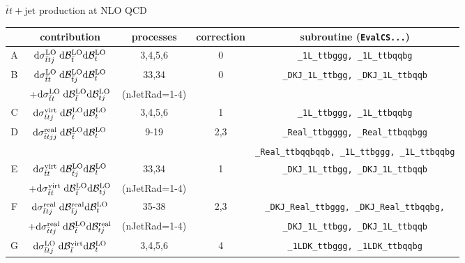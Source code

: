 \documentclass[12pt]{article}
\begin{document}
\centerline{\Large $\bar{t} t + \mathrm{jet}$ production at NLO QCD}


\vspace{1cm}
\newcommand{\tb}{\bar{t}}
\newcommand{\rd}{\mathrm{d}}
\newcommand{\LO}{\mathrm{LO}}
\newcommand{\NLO}{\mathrm{NLO}}
\newcommand{\VI}{\mathrm{virt}}
\newcommand{\RE}{\mathrm{real}}
\newcommand{\ds}{ \mathrm{d}\sigma_{\bar{t}t}}
\newcommand{\dsj}{\mathrm{d}\sigma_{\bar{t}tj}}
\newcommand{\dsjj}{\mathrm{d}\sigma_{\bar{t}tjj}}
\newcommand{\dBtb}{\; \mathrm{d}{\cal B}_{\bar{t}}}
\newcommand{\dBt}{  \mathrm{d}{\cal B}_{t}}
\newcommand{\dBtbj}{\;\mathrm{d}{\cal B}_{\bar{t}j}}
\newcommand{\dBtj}{ \mathrm{d}{\cal B}_{tj}}
\newcommand{\dBtbjj}{\;\mathrm{d}{\cal B}_{\bar{t}jj}}
\newcommand{\dBtjj}{ \mathrm{d}{\cal B}_{tjj}}
\begin{tabular}{ c  c  c  c  c }
\midrule
   & {\bf contribution} & {\bf processes } & {\bf correction} & {\bf subroutine (\texttt{EvalCS...})} \\
\midrule
    A &  $\dsj^\LO \dBtb^\LO \dBt^\LO  $   & 3,4,5,6 &  0 &  \texttt{\_1L\_ttbggg, \_1L\_ttbqqbg}\\
\midrule
    B &    $\ds^\LO \dBtbj^\LO \dBt^\LO  $   & 33,34 & 0&  \texttt{\_DKJ\_1L\_ttbgg, \_DKJ\_1L\_ttbqqb}\\
      &   +$\ds^\LO \dBtb^\LO \dBtj^\LO  $   & (nJetRad=1-4)  & \\
\midrule
\midrule
    C &    $\dsj^\VI \dBtb^\LO \dBt^\LO  $   & 3,4,5,6   & 1 &  \texttt{\_1L\_ttbggg, \_1L\_ttbqqbg} \\
\midrule
    D &    $\dsjj^\RE \dBtb^\LO \dBt^\LO  $ & 9-19  & 2,3 &  \texttt{\_Real\_ttbgggg, \_Real\_ttbqqbgg} \\
      &                                     &       &     & \texttt{\_Real\_ttbqqbqqb, \_1L\_ttbggg, \_1L\_ttbqqbg} \\
\midrule
    E &    $\ds^\VI \dBtbj^\LO \dBt^\LO   $ & 33,34  &  1 &  \texttt{\_DKJ\_1L\_ttbgg, \_DKJ\_1L\_ttbqqb}\\
      &    +$\ds^\VI \dBtb^\LO \dBtj^\LO   $ & (nJetRad=1-4)  &   \\
\midrule
    F &    $\dsj^\RE \dBtbj^\RE \dBt^\LO   $ & 35-38  &  2,3 &  \texttt{\_DKJ\_Real\_ttbggg, \_DKJ\_Real\_ttbqqbg,} \\
      &    $+\dsj^\RE \dBtb^\LO \dBtj^\RE   $ & (nJetRad=1-4)  &  &  \texttt{\_DKJ\_1L\_ttbgg, \_DKJ\_1L\_ttbqqb} \\
\midrule
    G &    $\dsj^\LO \dBtb^\VI \dBt^\LO   $ & 3,4,5,6  &  4 &  \texttt{\_1LDK\_ttbggg, \_1LDK\_ttbqqbg}\\

\end{tabular}
\end{document}
